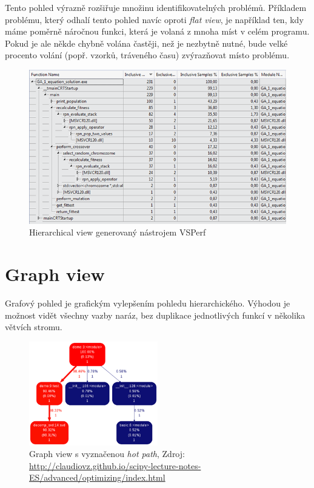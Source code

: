 \documentclass[czech,BP]{thesiskiv}
\begin{document}
Tento pohled výrazně rozšiřuje množinu identifikovatelných problémů. Příkladem problému, který odhalí tento pohled navíc oproti \emph{flat view}, je například ten, kdy máme poměrně náročnou funkci, která je volaná z mnoha míst v celém programu. Pokud je ale někde chybně volána častěji, než je nezbytně nutné, bude velké procento volání (popř. vzorků, tráveného času) zvýrazňovat místo problému.

\begin{figure}[h]
    \centering
    \includegraphics[interpolate,width=1.0\textwidth]{img/prof_calltree.png}
    \caption{Hierarchical view generovaný nástrojem VSPerf}
    \label{obr:hieview}
\end{figure}

\section{Graph view}

Grafový pohled je grafickým vylepšením pohledu hierarchického. Výhodou je možnost vidět všechny vazby naráz, bez duplikace jednotlivých funkcí v několika větvích stromu.

\begin{figure}[H]
    \centering
    \includegraphics[interpolate,width=0.5\textwidth]{img/prof_graph.png}
    \caption{Graph view s vyznačenou \emph{hot path}, Zdroj: \url{http://claudiovz.github.io/scipy-lecture-notes-ES/advanced/optimizing/index.html} }
    \label{obr:gview}
\end{figure}
\end{document}
